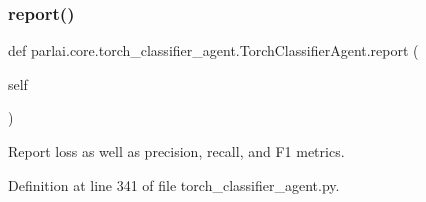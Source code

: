 \subsubsection{\texorpdfstring{report()}{report()}}
{\footnotesize\ttfamily def parlai.\+core.\+torch\+\_\+classifier\+\_\+agent.\+Torch\+Classifier\+Agent.\+report (\begin{DoxyParamCaption}\item[{}]{self }\end{DoxyParamCaption})}

\begin{DoxyVerb}Report loss as well as precision, recall, and F1 metrics.
\end{DoxyVerb}
 

Definition at line 341 of file torch\+\_\+classifier\+\_\+agent.\+py.


